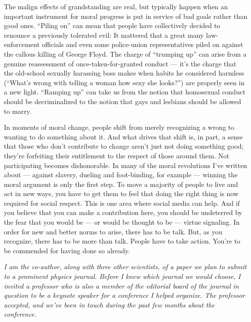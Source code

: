 The malign effects of grandstanding are real, but typically happen when
an important instrument for moral progress is put in service of bad
goals rather than good ones. ``Piling on'' can mean that people have
collectively decided to renounce a previously tolerated evil: It
mattered that a great many law-enforcement officials and even some
police-union representatives piled on against the callous killing of
George Floyd. The charge of ``trumping up'' can arise from a genuine
reassessment of once-taken-for-granted conduct --- it's the charge that
the old-school sexually harassing boss makes when habits he considered
harmless (``What's wrong with telling a woman how sexy she looks?'') are
properly seen in a new light. ``Ramping up'' can take us from the notion
that homosexual conduct should be decriminalized to the notion that gays
and lesbians should be allowed to marry.

In moments of moral change, people shift from merely recognizing a wrong
to wanting to do something about it. And what drives that shift is, in
part, a sense that those who don't contribute to change aren't just not
doing something good; they're forfeiting their entitlement to the
respect of those around them. Not participating becomes dishonorable. In
many of the moral revolutions I've written about --- against slavery,
dueling and foot-binding, for example --- winning the moral argument is
only the first step. To move a majority of people to live and act in new
ways, you have to get them to feel that doing the right thing is now
required for social respect. This is one area where social media can
help. And if you believe that you can make a contribution here, you
should be undeterred by the fear that you would be --- or would be
thought to be --- virtue signaling. In order for new and better norms to
arise, there has to be talk. But, as you recognize, there has to be more
than talk. People have to take action. You're to be commended for having
done so already.

\emph{I am the co-author, along with three other scientists, of a paper
we plan to submit to a prominent physics journal. Before I knew which
journal we would choose, I invited a professor who is also a member of
the editorial board of the journal in question to be a keynote speaker
for a conference I helped organize. The professor accepted, and we've
been in touch during the past few months about the conference.}


